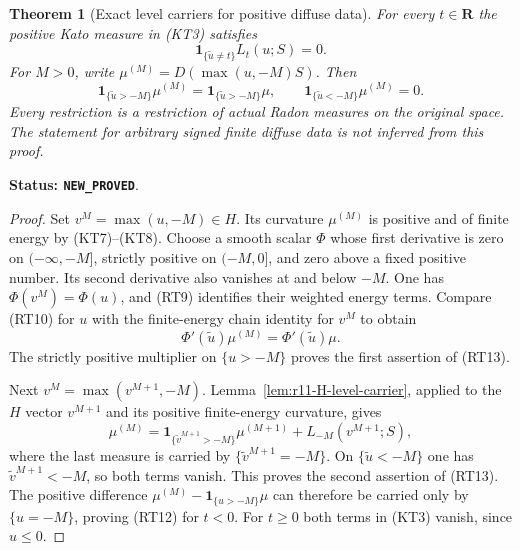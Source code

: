 \documentclass[11pt,a4paper]{article}
\numberwithin{equation}{section}
\newtheorem{theorem}{Theorem}[section]
\theoremstyle{definition}
\theoremstyle{remark}
\begin{document}
\begin{theorem}[Exact level carriers for positive diffuse data]
\label{thm:r11-positive-diffuse-exact-level-carrier}
For every $t\in\mathbf R$ the positive Kato measure in (KT3)
satisfies
\[
                       \mathbf1_{\{\widetilde u\ne t\}}L_t(u;S)=0.
 \tag{RT12}
\]
For $M>0$, write $\mu^{(M)}=D(\max(u,-M)S)$.  Then
\[
 \mathbf1_{\{\widetilde u>-M\}}\mu^{(M)}
           =\mathbf1_{\{\widetilde u>-M\}}\mu,
 \qquad
 \mathbf1_{\{\widetilde u<-M\}}\mu^{(M)}=0.
 \tag{RT13}
\]
Every restriction is a restriction of actual Radon measures
on the original space.  The statement for arbitrary signed
finite diffuse data is not inferred from this proof.
\end{theorem}

\noindent\textbf{Status: \texttt{NEW\_PROVED}}.

\begin{proof}
Set $v^M=\max(u,-M)\in H$.  Its curvature $\mu^{(M)}$ is
positive and of finite energy by (KT7)--(KT8).
Choose a smooth scalar $\Phi$ whose first derivative is zero
on $(-\infty,-M]$, strictly positive on $(-M,0]$, and zero
above a fixed positive number.  Its second derivative also
vanishes at and below $-M$.
One has $\Phi(v^M)=\Phi(u)$, and (RT9) identifies their
weighted energy terms.  Compare (RT10) for $u$ with the
finite-energy chain identity for $v^M$ to obtain
\[
            \Phi'(\widetilde u)\mu^{(M)}
                         =\Phi'(\widetilde u)\mu.
\]
The strictly positive multiplier on $\{u>-M\}$ proves the
first assertion of (RT13).

Next $v^M=\max(v^{M+1},-M)$.
Lemma~\ref{lem:r11-H-level-carrier}, applied to the $H$ vector
$v^{M+1}$ and its positive finite-energy curvature, gives
\[
 \mu^{(M)}=
 \mathbf1_{\{\widetilde v^{M+1}>-M\}}\mu^{(M+1)}
                          +L_{-M}(v^{M+1};S),
\]
where the last measure is carried by
$\{\widetilde v^{M+1}=-M\}$.
On $\{\widetilde u<-M\}$ one has
$\widetilde v^{M+1}<-M$, so both terms vanish.  This proves
the second assertion of (RT13).  The positive difference
$\mu^{(M)}-\mathbf1_{\{u>-M\}}\mu$ can therefore be carried
only by $\{u=-M\}$, proving (RT12) for $t<0$.
For $t\ge0$ both terms in (KT3) vanish, since $u\le0$.
\end{proof}
\end{document}
